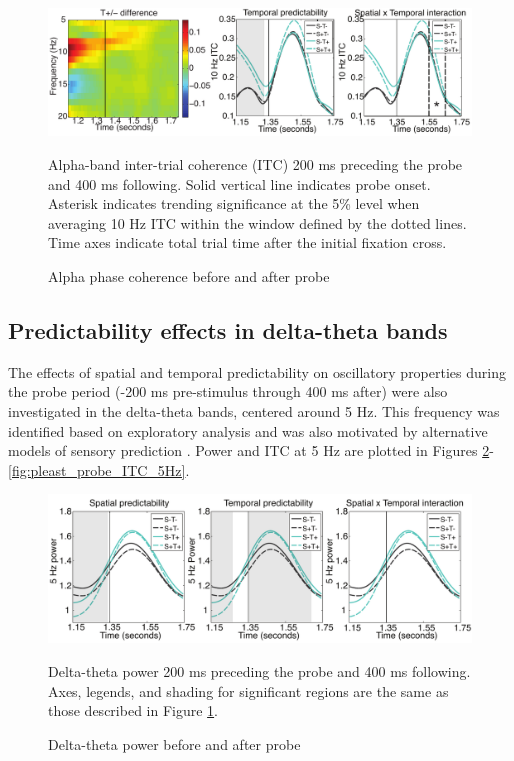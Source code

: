 \documentclass[dwyatte_dissertation.tex]{subfiles}
\begin{document}
\begin{figure}[h!]
\begin{center}
\includegraphics[width=160mm]{figs/chap_pleast/results_powphase_probe_ITC_montage.pdf}
\end{center}
\caption{Alpha phase coherence before and after probe}{Alpha-band inter-trial coherence (ITC) 200 ms preceding the probe and 400 ms following. Solid vertical line indicates probe onset. Asterisk indicates trending significance at the 5\% level when averaging 10 Hz ITC within the window defined by the dotted lines. Time axes indicate total trial time after the initial fixation cross.}
\label{fig:pleast_probe_ITC_10Hz}
\end{figure}

\subsection{Predictability effects in delta-theta bands}
The effects of spatial and temporal predictability on oscillatory properties during the probe period (-200 ms pre-stimulus through 400 ms after) were also investigated in the delta-theta bands, centered around 5 Hz. This frequency was identified based on exploratory analysis and was also motivated by alternative models of sensory prediction \cite[e.g.,]{ArnalGiraud12,GiraudPoeppel12}. Power and ITC at 5 Hz are plotted in Figures \ref{fig:pleast_probe_pow_5Hz}-\ref{fig:pleast_probe_ITC_5Hz}.

\begin{figure}[h!]
\begin{center}
\includegraphics[width=160mm]{figs/chap_pleast/results_powphase_probe_5Hz_pow_montage.pdf}
\end{center}
\caption{Delta-theta power before and after probe}{Delta-theta power 200 ms preceding the probe and 400 ms following. Axes, legends, and shading for significant regions are the same as those described in Figure \ref{fig:pleast_probe_ITC_10Hz}.}
\label{fig:pleast_probe_pow_5Hz}
\end{figure}
\end{document}
